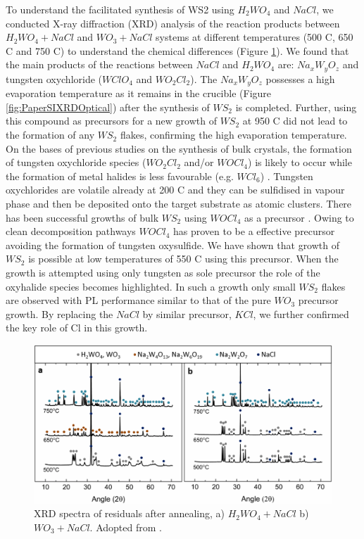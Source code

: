 
To understand the facilitated synthesis of WS2 using $H_2WO_4$ and $NaCl$, we conducted X-ray diffraction (XRD) analysis of the reaction products between $H_2WO_4+NaCl$ and $WO_3+NaCl$ systems at different temperatures (500 {\degree}C, 650 {\degree}C and 750 {\degree}C) to understand the chemical differences (Figure \ref{fig:PaperSIXRD}). We found that the main products of the reactions between $NaCl$ and $H_2WO_4$ are: $Na_xW_yO_z$ and tungsten oxychloride ($WClO_4$ and $WO_2Cl_2$). The $Na_xW_yO_z$ possesses a high evaporation temperature as it remains in the crucible (Figure \ref{fig:PaperSIXRDOptical}) after the synthesis of $WS_2$ is completed. Further, using this compound as precursors for a new growth of $WS_2$ at 950 {\degree}C did not lead to the formation of any $WS_2$ flakes, confirming the high evaporation temperature. On the bases of previous studies on the synthesis of bulk crystals, the formation of tungsten oxychloride species ($WO_2Cl_2$ and/or $WOCl_4$) is likely to occur while the formation of metal halides is less favourable (e.g. $WCl_6$) \cite{McKone2012}\cite{Baglio1983}. Tungsten oxychlorides are volatile already at 200 {\degree}C \cite{Turler2004} and they can be sulfidised in vapour phase and then be deposited onto the target substrate as atomic clusters. There has been successful growths of bulk $WS_2$ using $WOCl_4$ as a precursor \cite{Carmalt2003}. Owing to clean decomposition pathways $WOCl_4$ has proven to be a effective precursor avoiding the formation of tungsten oxysulfide. We have shown that growth of $WS_2$ is possible at low temperatures of 550 {\degree}C using this precursor. When the growth is attempted using only tungsten as sole precursor the role of the oxyhalide species becomes highlighted. In such a growth only small $WS_2$ flakes are observed with PL performance similar to that of the pure $WO_3$ precursor growth. By replacing the $NaCl$ by similar precursor, $KCl$, we further confirmed the key role of Cl in this growth.


\begin{figure}[h]
	\begin{center}
		\includegraphics[scale=0.3]{PaperSIXRD.png}
		\caption{XRD spectra of residuals after annealing, a) $H_2WO_4+NaCl$ b) $WO_3+NaCl$. Adopted from \cite{Reale2017}.}
		\label{fig:PaperSIXRD}
	\end{center}
\end{figure}

